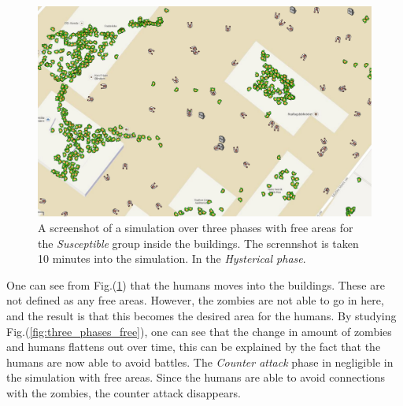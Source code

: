 \documentclass[%
twoside,                 %
final,                   %
chapterprefix=true,      %
open=right               %
10pt]{book}
\begin{document}
\vspace{3mm}




\vspace{3mm}




\begin{figure}[ht]
  \centerline{\includegraphics[width=0.8\linewidth]{3_fig/screenshot_three_phases_free.png}}
  \caption{
  \label{fig:screenshot_three_phases_free} A screenshot of a simulation over three phases with free areas for the \emph{Susceptible} group inside the buildings. The scrennshot is taken 10 minutes into the simulation. In the \emph{Hysterical phase}.
  }
\end{figure}


One can see from Fig.(\ref{fig:screenshot_three_phases_free}) that the humans moves into the buildings. These are not defined as any free areas. However, the zombies are not able to go in here, and the result is that this becomes the desired area for the humans. By studying Fig.(\ref{fig:three_phases_free}), one can see that the change in amount of zombies and humans flattens out over time, this can be explained by the fact that the humans are now able to avoid battles. The \emph{Counter attack} phase in negligible in the simulation with free areas. Since the humans are able to avoid connections with the zombies, the counter attack disappears.  
\end{document}
